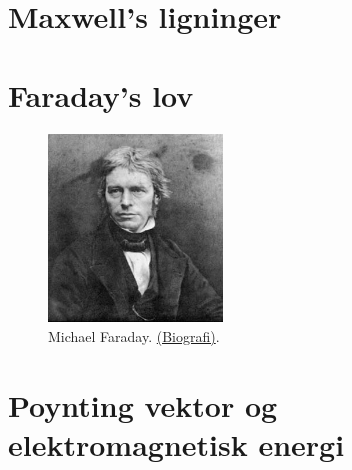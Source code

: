 


\section{Maxwell's ligninger}  \label{secMaxwellEq}





\section{Faraday's lov}  \label{secFaraday}

\begin{figure}[h]
\centerline{\includegraphics[height=50mm]{FIGS/PERSFaraday}}
\begin{center}
\caption{\small{Michael Faraday. \href{http://www-history.mcs.st-and.ac.uk/Mathematicians/Faraday.html}{(Biografi)}.}} \label{figFaraday}
\end{center}
\end{figure}





\section{Poynting vektor og elektromagnetisk energi}  \label{secPoynting}

